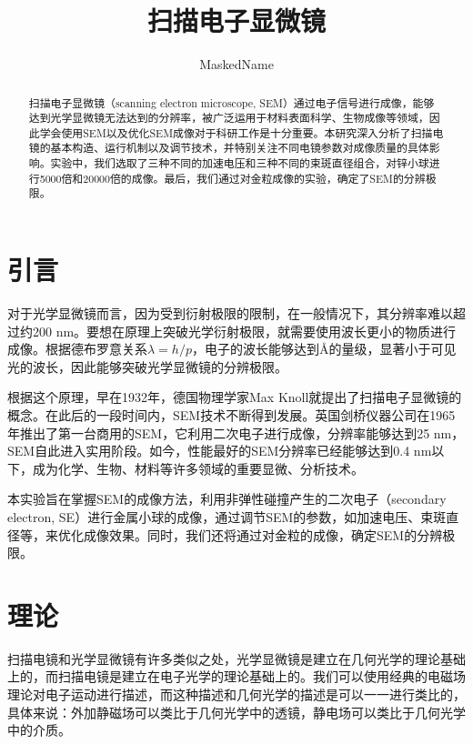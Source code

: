 \documentclass[font=default]{mpltx}
\begin{document}
\title{扫描电子显微镜} %
\author{MaskedName} %
\date{}

\begin{abstract}
  扫描电子显微镜（scanning electron microscope, SEM）通过电子信号进行成像，能够达到光学显微镜无法达到的分辨率，被广泛运用于材料表面科学、生物成像等领域，因此学会使用SEM以及优化SEM成像对于科研工作是十分重要。本研究深入分析了扫描电镜的基本构造、运行机制以及调节技术，并特别关注不同电镜参数对成像质量的具体影响。实验中，我们选取了三种不同的加速电压和三种不同的束斑直径组合，对锌小球进行5000倍和20000倍的成像。最后，我们通过对金粒成像的实验，确定了SEM的分辨极限。
\end{abstract}

\maketitle

\section{引言}
对于光学显微镜而言，因为受到衍射极限的限制，在一般情况下，其分辨率难以超过约200 nm。要想在原理上突破光学衍射极限，就需要使用波长更小的物质进行成像。根据德布罗意关系$\lambda=h/p$，电子的波长能够达到Å的量级，显著小于可见光的波长，因此能够突破光学显微镜的分辨极限。

根据这个原理，早在1932年，德国物理学家Max Knoll就提出了扫描电子显微镜的概念。在此后的一段时间内，SEM技术不断得到发展。英国剑桥仪器公司在1965年推出了第一台商用的SEM，它利用二次电子进行成像，分辨率能够达到25 nm，SEM自此进入实用阶段。如今，性能最好的SEM分辨率已经能够达到0.4 nm以下，成为化学、生物、材料等许多领域的重要显微、分析技术。

本实验旨在掌握SEM的成像方法，利用非弹性碰撞产生的二次电子（secondary electron, SE）进行金属小球的成像，通过调节SEM的参数，如加速电压、束斑直径等，来优化成像效果。同时，我们还将通过对金粒的成像，确定SEM的分辨极限。

\section{理论}
扫描电镜和光学显微镜有许多类似之处，光学显微镜是建立在几何光学的理论基础上的，而扫描电镜是建立在电子光学的理论基础上的。我们可以使用经典的电磁场理论对电子运动进行描述，而这种描述和几何光学的描述是可以一一进行类比的，具体来说：外加静磁场可以类比于几何光学中的透镜，静电场可以类比于几何光学中的介质。
\end{document}
